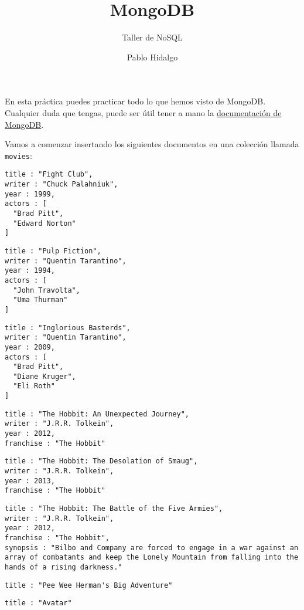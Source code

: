 \documentclass[]{article}
\title{MongoDB}
\subtitle{Taller de NoSQL}
\author{Pablo Hidalgo}
\date{}
\begin{document}
\maketitle

En esta práctica puedes practicar todo lo que hemos visto de MongoDB.
Cualquier duda que tengas, puede ser útil tener a mano la
\href{https://docs.mongodb.com/manual/}{documentación de MongoDB}.

Vamos a comenzar insertando los siguientes documentos en una colección
llamada \texttt{movies}:

\begin{verbatim}
title : "Fight Club",
writer : "Chuck Palahniuk",
year : 1999,
actors : [
  "Brad Pitt",
  "Edward Norton"
]
\end{verbatim}

\begin{verbatim}
title : "Pulp Fiction",
writer : "Quentin Tarantino",
year : 1994,
actors : [
  "John Travolta",
  "Uma Thurman"
]
\end{verbatim}

\begin{verbatim}
title : "Inglorious Basterds",
writer : "Quentin Tarantino",
year : 2009,
actors : [
  "Brad Pitt",
  "Diane Kruger",
  "Eli Roth"
]
\end{verbatim}

\begin{verbatim}
title : "The Hobbit: An Unexpected Journey",
writer : "J.R.R. Tolkein",
year : 2012,
franchise : "The Hobbit"
\end{verbatim}

\begin{verbatim}
title : "The Hobbit: The Desolation of Smaug",
writer : "J.R.R. Tolkein",
year : 2013,
franchise : "The Hobbit"
\end{verbatim}

\begin{verbatim}
title : "The Hobbit: The Battle of the Five Armies",
writer : "J.R.R. Tolkein",
year : 2012,
franchise : "The Hobbit",
synopsis : "Bilbo and Company are forced to engage in a war against an array of combatants and keep the Lonely Mountain from falling into the hands of a rising darkness."
\end{verbatim}

\begin{verbatim}
title : "Pee Wee Herman's Big Adventure"
\end{verbatim}

\begin{verbatim}
title : "Avatar"
\end{verbatim}
\end{document}
